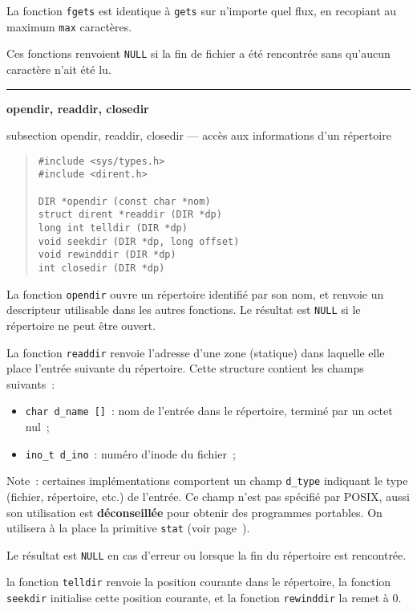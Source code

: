 \documentclass [twoside] {report}
\newcommand {\primitive} [1]
    {
	{\large \bf #1}
	\addcontentsline {toc} {subsection} {#1}
    }
\newcommand {\separation}
    {
	\vspace {7mm}
	\nopagebreak
	\hrule
    }
\begin{document}
La fonction {\tt fgets} est identique à {\tt gets} sur n'importe
quel flux, en recopiant au maximum {\tt max} caractères.

Ces fonctions renvoient {\tt NULL} si la fin de fichier a été
rencontrée sans qu'aucun caractère n'ait été lu.


\separation
\primitive {opendir, readdir, closedir} --- accès aux informations d'un répertoire

\begin {quote}
\begin {verbatim}
#include <sys/types.h>
#include <dirent.h>

DIR *opendir (const char *nom)
struct dirent *readdir (DIR *dp)
long int telldir (DIR *dp)
void seekdir (DIR *dp, long offset)
void rewinddir (DIR *dp)
int closedir (DIR *dp)
\end{verbatim}
\end {quote}

La fonction {\tt opendir} ouvre un répertoire identifié par son nom, et
renvoie un descripteur utilisable dans les autres fonctions. Le résultat
est {\tt NULL} si le répertoire ne peut être ouvert.

La fonction {\tt readdir} renvoie l'adresse d'une zone (statique) dans
laquelle elle place l'entrée suivante du répertoire. Cette structure
contient les champs suivants~:

\begin {itemize}
    \item {\tt char d\_name []}~: nom de l'entrée dans le
	répertoire, terminé par un octet nul~;
    \item {\tt ino\_t d\_ino}~: numéro d'inode du fichier~;
\end {itemize}

Note~: certaines implémentations comportent un champ \texttt {d\_type}
indiquant le type (fichier, répertoire, etc.) de l'entrée. Ce champ
n'est pas spécifié par POSIX, aussi son utilisation est \textbf
{déconseillée} pour obtenir des programmes portables. On utilisera à
la place la primitive \texttt {stat} (voir page~\pageref {stat}).

Le résultat est {\tt NULL} en cas d'erreur ou lorsque la fin du
répertoire est rencontrée.

la fonction {\tt telldir} renvoie la position courante dans le
répertoire, la fonction {\tt seekdir} initialise cette position
courante, et la fonction {\tt rewinddir} la remet à 0.
\end{document}
